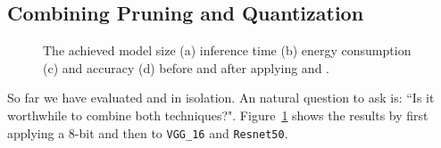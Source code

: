 \subsection{Combining Pruning and Quantization}

\begin{figure}[!t]
\centering
{}
\hfill
{}
\hfill
{}
\hfill
{}
\hfill
\caption{The achieved model size (a) inference time (b) energy consumption (c) and accuracy (d) before and after applying \quantization and \pruning.
}
\label{fig:combine}
\end{figure}

So far we have evaluated \pruning and \quantization in isolation. An natural question to ask is: ``Is it worthwhile to combine both
techniques?". Figure~\ref{fig:combine} shows the results by first applying a 8-bit \dquantization and then \pruning to \texttt{VGG\_16} and
\texttt{Resnet50}.


